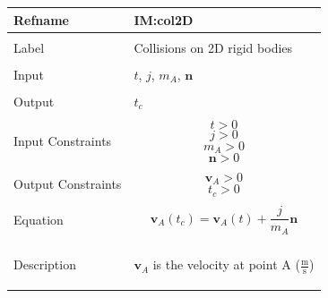 \documentclass[12pt]{article}
\begin{document}
\noindent \begin{minipage}{\textwidth}
\begin{tabular}{p{} p{}}
\toprule \textbf{Refname} & \textbf{IM:col2D}
\label{IM:col2D}
\\ \midrule \\
Label & Collisions on 2D rigid bodies
\\ \midrule \\
Input & $t$, $j$, ${m_{A}}$, $\mathbf{n}$
\\ \midrule \\
Output & ${t_{c}}$
\\ \midrule \\
Input Constraints & \begin{displaymath}
                    t>0
                    \end{displaymath}
                    \begin{displaymath}
                    j>0
                    \end{displaymath}
                    \begin{displaymath}
                    {m_{A}}>0
                    \end{displaymath}
                    \begin{displaymath}
                    \mathbf{n}>0
                    \end{displaymath}
\\ \midrule \\
Output Constraints & \begin{displaymath}
                     {\mathbf{v}_{A}}>0
                     \end{displaymath}
                     \begin{displaymath}
                     {t_{c}}>0
                     \end{displaymath}
\\ \midrule \\
Equation & \begin{displaymath}
           {\mathbf{v}_{A}}\left({t_{c}}\right)={\mathbf{v}_{A}}\left(t\right)+\frac{j}{{m_{A}}} \mathbf{n}
           \end{displaymath}
\\ \midrule \\
Description & \begin{symbDescription}
              \item{${\mathbf{v}_{A}}$ is the velocity at point A ($\frac{\text{m}}{\text{s}}$)}

\end{symbDescription}
\end{tabular}
\end{minipage}
\end{document}
